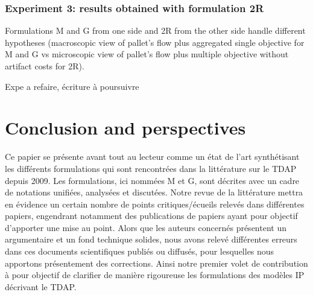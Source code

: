 \documentclass[preprint,12pt,authoryear]{elsarticle}
\begin{document}
\clearpage
\newpage
%
%
\subsubsection{Experiment 3: results obtained with formulation 2R}\label{sec:res2R}

\color{red}

Formulations M and G from one side and 2R from the other side handle different hypotheses 
(macroscopic view of pallet's flow plus aggregated single objective for M and G vs microscopic view of pallet's flow plus multiple objective without artifact costs for 2R).

Expe a refaire, écriture à poursuivre
\color{black}

%
%
\section{Conclusion and perspectives} 
\label{sec:ConclusionPerspectives}

\color{red}
Ce papier se présente avant tout au lecteur comme un état de l’art synthétisant  les différents formulations qui sont rencontrées dans la littérature sur le TDAP depuis 2009. 
Les formulations, ici nommées M et G, sont décrites avec un cadre de notations unifiées, analysées et discutées.
%
Notre revue de la littérature mettra en évidence un certain nombre de points critiques/écueils relevés dans différentes papiers, engendrant notamment des publications de papiers  ayant pour objectif d'apporter une mise au point.
Alors que les auteurs concernés présentent un argumentaire et un fond technique solides, nous avons relevé différentes erreurs dans ces documents scientifiques publiés ou diffusés, pour lesquelles nous apportons présentement des corrections.
Ainsi notre premier volet de contribution à pour objectif de clarifier de manière rigoureuse les formulations des modèles IP décrivant le TDAP.
\end{document}
